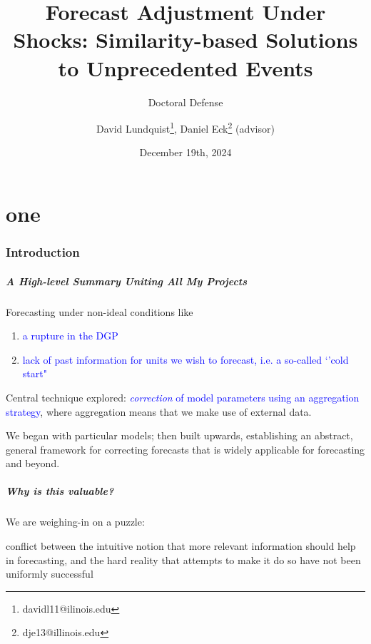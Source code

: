 \documentclass[9pt]{beamer}
\title{Forecast Adjustment Under Shocks: Similarity-based Solutions to Unprecedented Events}
\subtitle{Doctoral Defense}
\author{David Lundquist\thanks{davidl11@ilinois.edu}, Daniel Eck\thanks{dje13@illinois.edu} (advisor)}
\date{December 19th, 2024}
\theoremstyle{definition}
\begin{document}
\part{one}
\begin{frame}
\titlepage
\end{frame}

\section{Introduction}

\begin{frame}
    \frametitle{A High-level Summary Uniting All My Projects}
    
        Forecasting under non-ideal conditions like 

        \begin{enumerate}
            \item \textcolor{blue}{a rupture in the DGP}
            \item  \textcolor{blue}{lack of past information for units we wish to forecast, i.e. a so-called `'cold start"} \parencite[][]{fatemi2023mitigating}
        \end{enumerate}

        \bigskip

        Central technique explored: \textcolor{blue}{\textit{correction} of model parameters using an aggregation strategy}, where aggregation means that we make use of external data.


        \bigskip

        We began with particular models; then built upwards, establishing an abstract, general framework for correcting forecasts that is widely applicable for forecasting and beyond.

\end{frame}

    \begin{frame}
        \frametitle{Why is this valuable?}
        
            We are weighing-in on a puzzle:

            \begin{myquote}[colback=red!30, size=small]
                conflict between the intuitive notion that more relevant information should help in forecasting, and the hard reality that attempts to make it do so have not been uniformly successful \parencite[][]{clements2005guest}
            \end{myquote}

    \end{frame}
\end{document}
